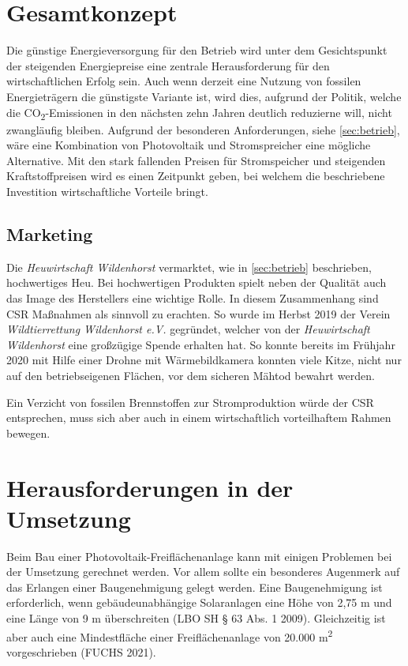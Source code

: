 \documentclass[11pt]{scrartcl}
\begin{document}
\section{Gesamtkonzept}
Die günstige Energieversorgung für den Betrieb wird unter dem Gesichtspunkt der steigenden Energiepreise eine zentrale Herausforderung für den wirtschaftlichen Erfolg sein.
Auch wenn derzeit eine Nutzung von fossilen Energieträgern die günstigste Variante ist, wird dies, aufgrund der Politik, welche die CO\textsubscript{2}-Emissionen in den nächsten zehn Jahren deutlich reduzierne will, nicht zwangläufig bleiben.
Aufgrund der besonderen Anforderungen, siehe \cref{sec:betrieb}, wäre eine Kombination von Photovoltaik und Stromspreicher eine mögliche Alternative.
Mit den stark fallenden Preisen für Stromspeicher  und steigenden Kraftstoffpreisen wird es einen Zeitpunkt geben, bei welchem die beschriebene Investition wirtschaftliche Vorteile bringt.

\subsection{Marketing}
Die \textit{Heuwirtschaft Wildenhorst} vermarktet, wie in \cref{sec:betrieb} beschrieben, hochwertiges Heu.
Bei hochwertigen Produkten spielt neben der Qualität auch das Image des Herstellers eine wichtige Rolle.
In diesem Zusammenhang sind \ac{CSR} Maßnahmen als sinnvoll zu erachten.
So wurde im Herbst 2019 der Verein \textit{Wildtierrettung Wildenhorst e.V.} gegründet, welcher von der \textit{Heuwirtschaft Wildenhorst} eine großzügige Spende erhalten hat.
So konnte bereits im Frühjahr 2020 mit Hilfe einer Drohne mit Wärmebildkamera konnten viele Kitze, nicht nur auf den betriebseigenen Flächen, vor dem sicheren Mähtod bewahrt werden.

Ein Verzicht von fossilen Brennstoffen zur Stromproduktion würde der \ac{CSR} entsprechen, muss sich aber auch in einem wirtschaftlich vorteilhaftem Rahmen bewegen.




\section{Herausforderungen in der Umsetzung}
Beim Bau einer Photovoltaik-Freiflächenanlage kann mit einigen Problemen bei der Umsetzung gerechnet werden.
Vor allem sollte ein besonderes Augenmerk auf das Erlangen einer Baugenehmigung gelegt werden.
Eine Baugenehmigung ist erforderlich, wenn gebäudeunabhängige Solaranlagen eine Höhe von 2,75 m und eine Länge von 9 m überschreiten (LBO SH § 63 Abs. 1 2009).
Gleichzeitig ist aber auch eine Mindestfläche einer Freiflächenanlage von 20.000 m\textsuperscript{2} vorgeschrieben (FUCHS 2021).
 
\end{document}
